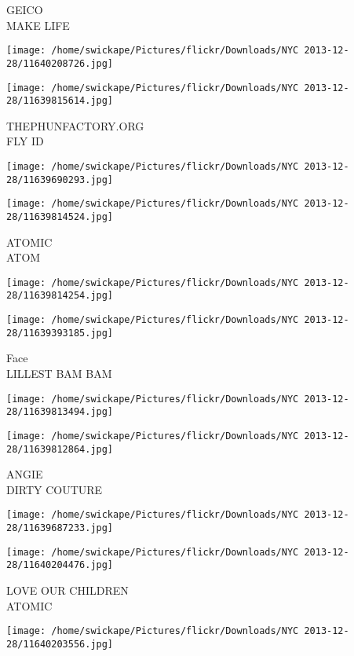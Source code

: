 \documentclass[10pt,letterpaper]{article}
\begin{document}
GEICO\\
MAKE LIFE
\pagebreak

\texttt{[image: /home/swickape/Pictures/flickr/Downloads/NYC 2013-12-28/11640208726.jpg]}

\vspace{0.25in}
\texttt{[image: /home/swickape/Pictures/flickr/Downloads/NYC 2013-12-28/11639815614.jpg]}

THEPHUNFACTORY.ORG\\
FLY ID
\pagebreak

\texttt{[image: /home/swickape/Pictures/flickr/Downloads/NYC 2013-12-28/11639690293.jpg]}

\vspace{0.25in}
\texttt{[image: /home/swickape/Pictures/flickr/Downloads/NYC 2013-12-28/11639814524.jpg]}

ATOMIC\\
ATOM
\pagebreak

\texttt{[image: /home/swickape/Pictures/flickr/Downloads/NYC 2013-12-28/11639814254.jpg]}

\vspace{0.25in}
\texttt{[image: /home/swickape/Pictures/flickr/Downloads/NYC 2013-12-28/11639393185.jpg]}

Face\\
LILLEST BAM BAM
\pagebreak

\texttt{[image: /home/swickape/Pictures/flickr/Downloads/NYC 2013-12-28/11639813494.jpg]}

\vspace{0.25in}
\texttt{[image: /home/swickape/Pictures/flickr/Downloads/NYC 2013-12-28/11639812864.jpg]}

ANGIE\\
DIRTY COUTURE
\pagebreak

\texttt{[image: /home/swickape/Pictures/flickr/Downloads/NYC 2013-12-28/11639687233.jpg]}

\vspace{0.25in}
\texttt{[image: /home/swickape/Pictures/flickr/Downloads/NYC 2013-12-28/11640204476.jpg]}

LOVE OUR CHILDREN\\
ATOMIC
\pagebreak

\texttt{[image: /home/swickape/Pictures/flickr/Downloads/NYC 2013-12-28/11640203556.jpg]}
\end{document}
